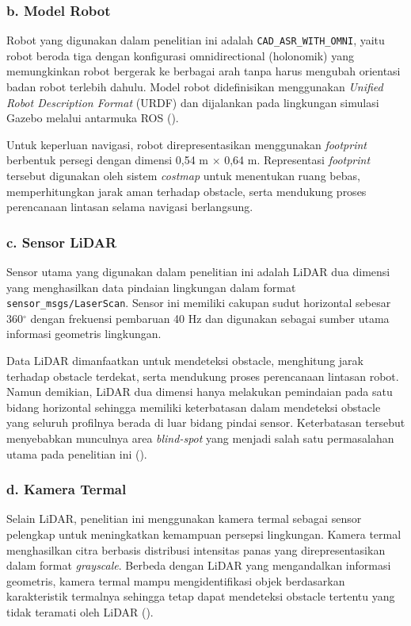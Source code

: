 \subsubsection*{b. Model Robot}

Robot yang digunakan dalam penelitian ini adalah \texttt{CAD\_ASR\_WITH\_OMNI}, yaitu robot be\-roda tiga dengan konfigurasi omnidirectional (holonomik) yang memungkinkan robot bergerak ke berbagai arah tanpa harus mengubah orientasi badan robot terlebih dahulu. Model robot didefinisikan menggunakan \textit{Unified Robot Description Format} (URDF) dan dijalankan pada lingkungan simulasi Gazebo melalui antarmuka ROS (\cite{Adiuku2024}).

Untuk keperluan navigasi, robot direpresentasikan menggunakan \textit{footprint} berbentuk per\-segi dengan dimensi 0,54 m $\times$ 0,64 m. Representasi \textit{footprint} tersebut digunakan oleh sistem \textit{costmap} untuk menentukan ruang bebas, memperhitungkan jarak aman terhadap obstacle, serta mendukung proses perencanaan lintasan selama navigasi berlangsung.

\subsubsection*{c. Sensor LiDAR}

Sensor utama yang digunakan dalam penelitian ini adalah LiDAR dua dimensi yang menghasilkan data pindaian lingkungan dalam format \texttt{sensor\_msgs/LaserScan}. Sensor ini memiliki cakupan sudut horizontal sebesar 360$^\circ$ dengan frekuensi pembaruan 40 Hz dan digunakan sebagai sumber utama informasi geometris lingkungan.

Data LiDAR dimanfaatkan untuk mendeteksi obstacle, menghitung jarak terhadap obstacle terdekat, serta mendukung proses perencanaan lintasan robot. Namun demikian, LiDAR dua dimensi hanya melakukan pemindaian pada satu bidang horizontal sehingga memiliki keterbatasan dalam mendeteksi obstacle yang seluruh profilnya berada di luar bidang pindai sensor. Keterbatasan tersebut menyebabkan munculnya area \textit{blind-spot} yang menjadi salah satu permasalahan utama pada penelitian ini (\cite{Fagundes2024,Kibii2022}).

\subsubsection*{d. Kamera Termal}

Selain LiDAR, penelitian ini menggunakan kamera termal sebagai sensor pelengkap untuk meningkatkan kemampuan persepsi lingkungan. Kamera termal menghasilkan citra berbasis distribusi intensitas panas yang direpresentasikan dalam format \textit{grayscale}. Berbeda dengan LiDAR yang mengandalkan informasi geometris, kamera termal mampu mengidentifikasi objek berdasarkan karakteristik termalnya sehingga tetap dapat mendeteksi obstacle tertentu yang tidak teramati oleh LiDAR (\cite{Choi2023}).

